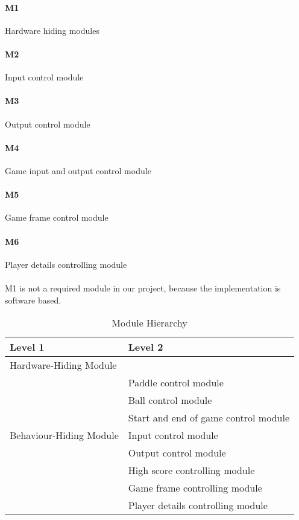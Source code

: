 \documentclass[12pt,letterpaper]{article}
\begin{document}
	\paragraph{M1} Hardware hiding modules
	\paragraph{M2} Input control module
	\paragraph{M3} Output control module
	\paragraph{M4} Game input and output control module
	\paragraph{M5} Game frame control module
	\paragraph{M6} Player details controlling module
	\paragraph{} M1 is not a required module in our project, because the implementation is software based.

\begin{table}[h!]
\centering
\begin{tabular}{p{} p{}}
\toprule
\textbf{Level 1} & \textbf{Level 2}\\
\midrule
{Hardware-Hiding Module} & ~ \\
\midrule
\multirow{7}{0.3\textwidth}{Behaviour-Hiding Module} & Paddle control module\\
& Ball control module\\
& Start and end of game control module\\
& Input control module\\
& Output control module\\
\midrule
\multirow{3}{0.3\textwidth}{Software Decision Module} & High score controlling module\\
& Game frame controlling module\\
& Player details controlling module\\
\bottomrule
\end{tabular}
\caption{Module Hierarchy}
\label{TblMH}
\end{table}
\end{document}
